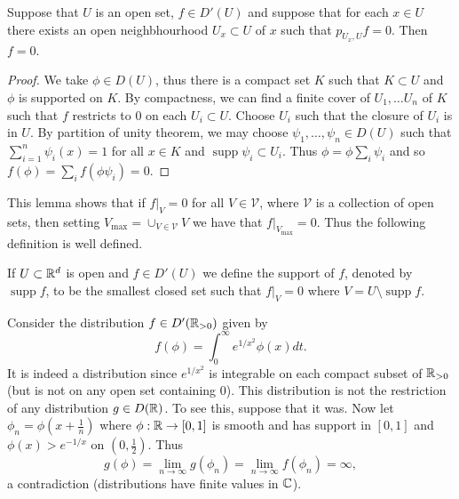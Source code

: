 \documentclass[twoside, a4paper, 10pt]{amsart}
\begin{document}
\begin{lemma} Suppose that $U$ is an open set, $f \in D'(U)$ and suppose that for each $x \in U$ there exists an open neighbhourhood $U_x \subset U$ of $x$ such that $p_{U_x, U} f = 0$. Then $f=0$.

\end{lemma}

\begin{proof} We take $\phi \in D(U)$, thus there is a compact set $K$ such that $K \subset U$ and $\phi$ is supported on $K$. By compactness, we can find a finite cover of $U_1, \ldots U_n$ of $K$ such that $f$ restricts to $0$ on each $U_i \subset U$. Choose $U_i$ such that the closure of $U_i$ is in $U$. By partition of unity theorem, we may choose $\psi_1, \ldots, \psi_n \in D(U)$ such that $\sum_{i=1}^n \psi_i (x) = 1$ for all $x \in K$ and $\operatorname{supp} \psi_i \subset U_i$. Thus $\phi = \phi \sum_{i} \psi_i$ and so $f(\phi) = \sum_i f(\phi \psi_i) = 0.$ \end{proof}

This lemma shows that if $f|_V = 0$ for all $V \in \mathcal{V}$, where $\mathcal{V}$ is a collection of open sets, then setting $V_{\max} = \cup_{V \in \mathcal{V}} V$ we have that $f|_{V_{\max}} = 0$. Thus the following definition is well defined.

\begin{mydef} If $U \subset \mathbb{R}^d$ is open and $f \in D'(U)$ we define the support of $f$, denoted by $\operatorname{supp} f$, to be the smallest closed set such that $f|_V = 0$ where $V = U \setminus \operatorname{supp} f$.

\end{mydef}

\begin{eg} Consider the distribution $f \in D'(\mathbb{R}_{>0})$ given by $$f(\phi) = \int_0^{\infty} e^{1/x^2} \phi(x) dt.$$ It is indeed a distribution since $e^{1/x^2}$ is integrable on each compact subset of $\mathbb{R}_{>0}$ (but is not on any open set containing $0$). This distribution is not the restriction of any distribution $g \in D(\mathbb{R})$. To see this, suppose that it was. Now let $\phi_n = \phi(x+\frac{1}{n})$ where $\phi:\mathbb{R} \to [0,1]$ is smooth and has support in $[0,1]$ and $\phi(x) > e^{-1/x}$ on $(0,\frac{1}{2})$. Thus $$g(\phi) = \lim_{n \to \infty} g(\phi_n) = \lim_{n \to \infty} f(\phi_n) = \infty,$$ a contradiction (distributions have finite values in $\mathbb{C}$).

\end{eg}
\end{document}
